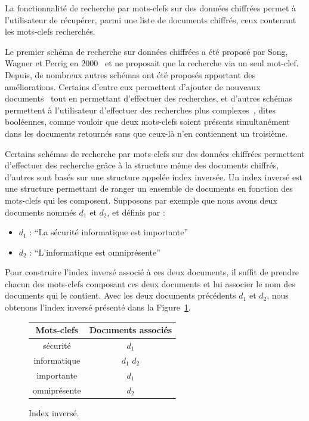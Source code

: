 \documentclass[french]{article}
\begin{document}
La fonctionnalité de recherche par mots-clefs sur des données
chiffrées permet à l'utilisateur de récupérer, parmi une liste de
documents chiffrés, ceux contenant les mots-clefs recherchés.

Le premier schéma de recherche sur données chiffrées a été proposé par
Song, Wagner et Perrig en 2000~\cite{SongWP00} et ne proposait que la
recherche via un seul mot-clef. Depuis, de nombreux autres schémas ont
été proposés apportant des améliorations. Certains d'entre eux
permettent d'ajouter de nouveaux documents~\cite{KamaraPR12} tout en
permettant d'effectuer des recherches, et d'autres schémas permettent
à l'utilisateur d'effectuer des recherches plus
complexes~\cite{CashJJKRS13}, dites booléennes, comme vouloir que deux
mots-clefs soient présents simultanément dans les documents retournés
sans que ceux-là n'en contiennent un troisième.

Certains schémas de recherche par mots-clefs sur des données chiffrées
permettent d'effectuer des recherche grâce à la structure même des
documents chiffrés, d'autres sont basés sur une structure appelée
index inversée. Un index inversé est une structure permettant de
ranger un ensemble de documents en fonction des mots-clefs qui les
composent. Supposons par exemple que nous avons deux documents nommés
$d_1$ et $d_2$, et définis par :

\begin{itemize}
\item $d_1$ : ``La sécurité informatique est importante''
\item $d_2$ : ``L'informatique est omniprésente''
\end{itemize}

Pour construire l'index inversé associé à ces deux documents, il
suffit de prendre chacun des mots-clefs composant ces deux documents
et lui associer le nom des documents qui le contient. Avec les deux
documents précédents $d_1$ et $d_2$, nous obtenons l'index inversé
présenté dans la Figure~\ref{fig:indexinv}.

\begin{figure}[h]
  \centering
  \begin{tabular}{|c|c|}
    \hline
    Mots-clefs & Documents associés \\
    \hline
    sécurité & $d_1$ \\
    \hline
    informatique & $d_1$ $d_2$ \\
    \hline
    importante & $d_1$ \\
    \hline
    omniprésente & $d_2$ \\
    \hline
  \end{tabular}
  \caption{Index inversé.}
  \label{fig:indexinv}
\end{figure}
\end{document}
